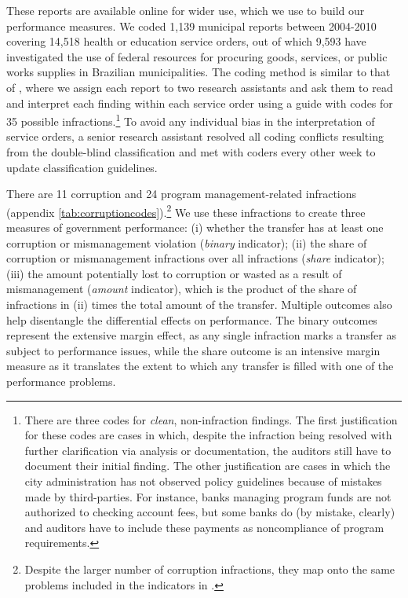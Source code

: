 \documentclass[11pt]{article}
\begin{document}
These reports are available online for wider use, which we use to build our performance measures. We coded 1,139 municipal reports between 2004-2010 covering 14,518 health or education service orders, out of which 9,593 have investigated the use of federal resources for procuring goods, services, or public works supplies in Brazilian municipalities. The coding method is similar to that of \citet{FerrazExposingCorruptPoliticians2008b}, where we assign each report to two research assistants and ask them to read and interpret each finding within each service order using a guide with codes for 35 possible infractions.\footnote{There are three codes for \emph{clean}, non-infraction findings. The first justification for these codes are cases in which, despite the infraction being resolved with further clarification via analysis or documentation, the auditors still have to document their initial finding. The other justification are cases in which the city administration has not observed policy guidelines because of mistakes made by third-parties. For instance, banks managing program funds are not authorized to checking account fees, but some banks do (by mistake, clearly) and auditors have to include these payments as noncompliance of program requirements.} To avoid any individual bias in the interpretation of service orders, a senior research assistant resolved all coding conflicts resulting from the double-blind classification and met with coders every other week to update classification guidelines.

There are 11 corruption and 24 program management-related infractions (appendix \ref{tab:corruptioncodes}).\footnote{Despite the larger number of corruption infractions, they map onto the same problems included in the indicators in \citet{FerrazExposingCorruptPoliticians2008b,FerrazElectoralAccountabilityCorruption2011a}.} We use these infractions to create three measures of government performance: (i) whether the transfer has at least one corruption or mismanagement violation (\emph{binary} indicator); (ii) the share of corruption or mismanagement infractions over all infractions (\emph{share} indicator); (iii) the amount potentially lost to corruption or wasted as a result of mismanagement (\emph{amount} indicator), which is the product of the share of infractions in (ii) times the total amount of the transfer. Multiple outcomes also help disentangle the differential effects on performance. The binary outcomes represent the extensive margin effect, as any single infraction marks a transfer as subject to performance issues, while the share outcome is an intensive margin measure as it translates the extent to which any transfer is filled with one of the performance problems.
\end{document}
